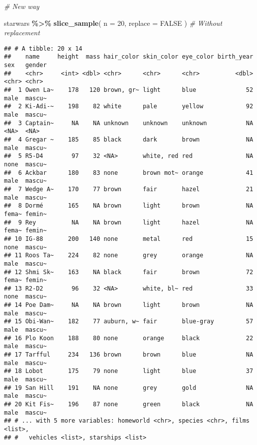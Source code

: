 \documentclass[
]{book}
\newenvironment{Shaded}{\begin{snugshade}}{\end{snugshade}}
\newcommand{\CommentTok}[1]{\textcolor[rgb]{0.56,0.35,0.01}{\textit{#1}}}
\newcommand{\DataTypeTok}[1]{\textcolor[rgb]{0.13,0.29,0.53}{#1}}
\newcommand{\DecValTok}[1]{\textcolor[rgb]{0.00,0.00,0.81}{#1}}
\newcommand{\KeywordTok}[1]{\textcolor[rgb]{0.13,0.29,0.53}{\textbf{#1}}}
\newcommand{\NormalTok}[1]{#1}
\newcommand{\OperatorTok}[1]{\textcolor[rgb]{0.81,0.36,0.00}{\textbf{#1}}}
\newcommand{\OtherTok}[1]{\textcolor[rgb]{0.56,0.35,0.01}{#1}}
\newcommand{\StringTok}[1]{\textcolor[rgb]{0.31,0.60,0.02}{#1}}
\begin{document}
\begin{Shaded}
\begin{Highlighting}[]
\CommentTok{\# New way}

\NormalTok{starwars }\OperatorTok{\%\textgreater{}\%}
\StringTok{  }\KeywordTok{slice\_sample}\NormalTok{(}
    \DataTypeTok{n =} \DecValTok{20}\NormalTok{,}
    \DataTypeTok{replace =} \OtherTok{FALSE}
\NormalTok{  ) }\CommentTok{\# Without replacement}
\end{Highlighting}
\end{Shaded}

\begin{verbatim}
## # A tibble: 20 x 14
##    name     height  mass hair_color skin_color eye_color birth_year sex   gender
##    <chr>     <int> <dbl> <chr>      <chr>      <chr>          <dbl> <chr> <chr> 
##  1 Owen La~    178   120 brown, gr~ light      blue              52 male  mascu~
##  2 Ki-Adi-~    198    82 white      pale       yellow            92 male  mascu~
##  3 Captain~     NA    NA unknown    unknown    unknown           NA <NA>  <NA>  
##  4 Gregar ~    185    85 black      dark       brown             NA male  mascu~
##  5 R5-D4        97    32 <NA>       white, red red               NA none  mascu~
##  6 Ackbar      180    83 none       brown mot~ orange            41 male  mascu~
##  7 Wedge A~    170    77 brown      fair       hazel             21 male  mascu~
##  8 Dormé       165    NA brown      light      brown             NA fema~ femin~
##  9 Rey          NA    NA brown      light      hazel             NA fema~ femin~
## 10 IG-88       200   140 none       metal      red               15 none  mascu~
## 11 Roos Ta~    224    82 none       grey       orange            NA male  mascu~
## 12 Shmi Sk~    163    NA black      fair       brown             72 fema~ femin~
## 13 R2-D2        96    32 <NA>       white, bl~ red               33 none  mascu~
## 14 Poe Dam~     NA    NA brown      light      brown             NA male  mascu~
## 15 Obi-Wan~    182    77 auburn, w~ fair       blue-gray         57 male  mascu~
## 16 Plo Koon    188    80 none       orange     black             22 male  mascu~
## 17 Tarfful     234   136 brown      brown      blue              NA male  mascu~
## 18 Lobot       175    79 none       light      blue              37 male  mascu~
## 19 San Hill    191    NA none       grey       gold              NA male  mascu~
## 20 Kit Fis~    196    87 none       green      black             NA male  mascu~
## # ... with 5 more variables: homeworld <chr>, species <chr>, films <list>,
## #   vehicles <list>, starships <list>
\end{verbatim}
\end{document}
